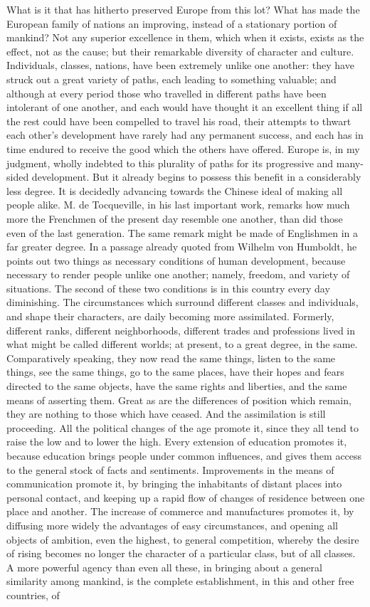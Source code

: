 \documentclass[12pt]{report}
\begin{document}
What is it that has hitherto preserved Europe from this lot? What has made the European family of nations an improving, instead of a stationary portion of mankind? Not any superior excellence in them, which when it exists, exists as the effect, not as the cause; but their remarkable diversity of character and culture. Individuals, classes, nations, have been extremely unlike one another: they have struck out a great variety of paths, each leading to something valuable; and although at every period those who travelled in different paths have been intolerant of one another, and each would have thought it an excellent thing if all the rest could have been compelled to travel his road, their attempts to thwart each other's development have rarely had any permanent success, and each has in time endured to receive the good which the others have offered. Europe is, in my judgment, wholly indebted to this plurality of paths for its progressive and many-sided development. But it already begins to possess this benefit in a considerably less degree. It is decidedly advancing towards the Chinese ideal of making all people alike. M. de Tocqueville, in his last important work, remarks how much more the Frenchmen of the present day resemble one another, than did those even of the last generation. The same remark might be made of Englishmen in a far greater degree. In a passage already quoted from Wilhelm von Humboldt, he points out two things as necessary conditions of human development, because necessary to render people unlike one another; namely, freedom, and variety of situations. The second of these two conditions is in this country every day diminishing. The circumstances which surround different classes and individuals, and shape their characters, are daily becoming more assimilated. Formerly, different ranks, different neighborhoods, different trades and professions lived in what might be called different worlds; at present, to a great degree, in the same. Comparatively speaking, they now read the same things, listen to the same things, see the same things, go to the same places, have their hopes and fears directed to the same objects, have the same rights and liberties, and the same means of asserting them. Great as are the differences of position which remain, they are nothing to those which have ceased. And the assimilation is still proceeding. All the political changes of the age promote it, since they all tend to raise the low and to lower the high. Every extension of education promotes it, because education brings people under common influences, and gives them access to the general stock of facts and sentiments. Improvements in the means of communication promote it, by bringing the inhabitants of distant places into personal contact, and keeping up a rapid flow of changes of residence between one place and another. The increase of commerce and manufactures promotes it, by diffusing more widely the advantages of easy circumstances, and opening all objects of ambition, even the highest, to general competition, whereby the desire of rising becomes no longer the character of a particular class, but of all classes. A more powerful agency than even all these, in bringing about a general similarity among mankind, is the complete establishment, in this and other free countries, of 
\end{document}
